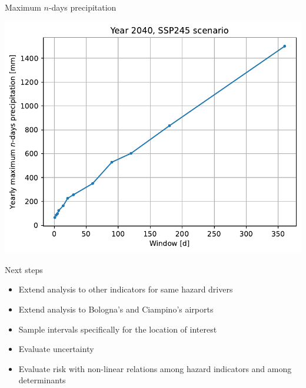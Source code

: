 \documentclass[aspectratio=169]{beamer}
\begin{document}
\begin{frame}{Maximum $n$-days precipitation}
  \begin{center}
    \includegraphics[width=0.9\textheight]{max_n_day_precipitation_amount_ssp245}
  \end{center}
\end{frame}



\begin{frame}{Next steps}
  \begin{itemize}
    \item Extend analysis to other indicators for same hazard drivers
    \item Extend analysis to Bologna's and Ciampino's airports
    \item Sample intervals specifically for the location of interest
    \item Evaluate uncertainty
    \item Evaluate risk with non-linear relations among hazard indicators and among determinants
  \end{itemize}
\end{frame}
\end{document}
